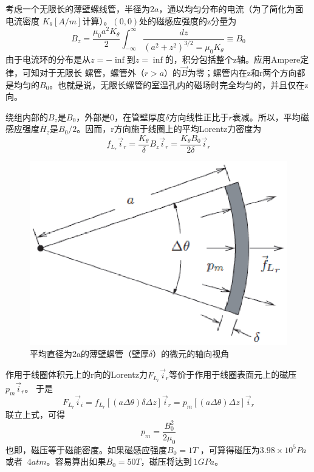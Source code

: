 考虑一个无限长的薄壁螺线管，半径为$2a$，通以均匀分布的电流（为了简化为面电流密度
$K_\theta [A/m]$计算）。$(0,0)$处的磁感应强度的z分量为
\begin{equation}\label{eqn:inf solenoid}
  B_z=\frac{\mu_0 a^2 K_\theta}{2}\int_{-\infty}^{\infty}\frac{dz}{(a^2+z^2)^{3/2}=\mu_0 K_\theta}\equiv B_0
\end{equation}
由于电流环的分布是从$z=-\inf$到$z=\inf$的，积分包括整个z轴。应用Ampere定律，可知对于无限长
螺管，螺管外（$r>a$）的$\vec{B}$为零；螺管内在z和r两个方向都是均匀的$B_0$。也就是说，无限长螺管的室温孔内的磁场时完全均匀的，并且仅在z向。

绕组内部的$B_z$是$B_0$，外部是0，在管壁厚度$\delta$方向线性正比于$r$衰减。所以，平均磁感应强度$\bar{H}_z$是$B_0/2$。因而，r方向施于线圈上的平均Lorentz力密度为
\begin{equation}\label{eqn:inf solenoid fl}
  f_{L_r}\vec{i}_r=\frac{K_\theta}{\delta}B_z \vec{i}_r=\frac{K_\theta B_0}{2\delta}\vec{i}_r
\end{equation}

\begin{figure}[htbp]
  \centering
 \includegraphics[scale=0.6]{chpt3/figs/fig3.2.eps}
  \caption{平均直径为2a的薄壁螺管（壁厚$\delta$）的微元的轴向视角}
\end{figure}
作用于线圈体积元上的r向的Lorentz力$F_{L_r}\vec{i}_r$等价于作用于线圈表面元上的磁压$p_m\vec{i}_r$。
于是
\begin{equation}\label{eqn:inf solenoid fl2}
  F_{L_r}\vec{i}_i =f_{L_r}[(a\Delta \theta)\delta \Delta z]\vec{i}_r=p_m[(a\Delta \theta)\Delta z]\vec{i}_r
\end{equation}
联立上式，可得
\begin{equation}\label{eqn:mag press}
  p_m=\frac{B_0^2}{2\mu_0}
\end{equation}
也即，磁压等于磁能密度。如果磁感应强度$B_0=1 T$ ，可算得磁压为$3.98\times 10^5 Pa$或者
$~4 atm$。容易算出如果$B_0=50 T$，磁压将达到$~1 GPa$。


